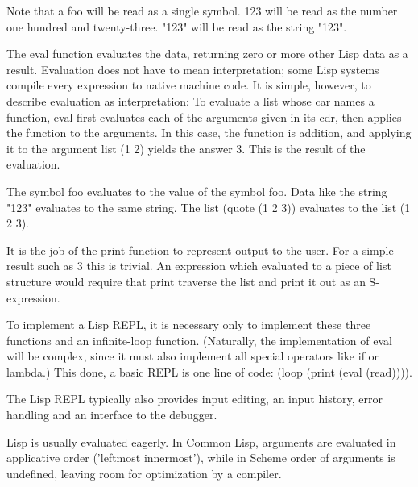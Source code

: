 \documentclass[a4paper]{book}
\begin{document}
Note that a foo will be read as a single symbol. 123 will be read as the number one hundred and twenty-three. "123" will be read as the string "123".

The eval function evaluates the data, returning zero or more other Lisp data as a result. Evaluation does not have to mean interpretation; some Lisp systems compile every expression to native machine code. It is simple, however, to describe evaluation as interpretation: To evaluate a list whose car names a function, eval first evaluates each of the arguments given in its cdr, then applies the function to the arguments. In this case, the function is addition, and applying it to the argument list (1 2) yields the answer 3. This is the result of the evaluation.

The symbol foo evaluates to the value of the symbol foo. Data like the string "123" evaluates to the same string. The list (quote (1 2 3)) evaluates to the list (1 2 3).

It is the job of the print function to represent output to the user. For a simple result such as 3 this is trivial. An expression which evaluated to a piece of list structure would require that print traverse the list and print it out as an S-expression.

To implement a Lisp REPL, it is necessary only to implement these three functions and an infinite-loop function. (Naturally, the implementation of eval will be complex, since it must also implement all special operators like if or lambda.) This done, a basic REPL is one line of code: (loop (print (eval (read)))).

The Lisp REPL typically also provides input editing, an input history, error handling and an interface to the debugger.

Lisp is usually evaluated eagerly. In Common Lisp, arguments are evaluated in applicative order ('leftmost innermost'), while in Scheme order of arguments is undefined, leaving room for optimization by a compiler.
\end{document}

